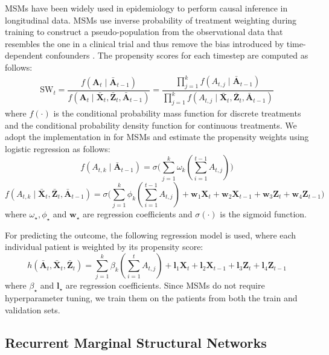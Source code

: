 \documentclass{article}
\newcommand{\vc}[1]{\mathbf{#1}}
\newcommand{\hist}[1]{\bar{\vc{#1}}}
\begin{document}
	MSMs \citep{robins2000marginal, hernan2001marginal} have been widely used in epidemiology to perform causal inference in longitudinal data. MSMs use inverse probability of treatment weighting during training to construct a pseudo-population from the observational data that resembles the one in a clinical trial and thus remove the bias introduced by time-dependent confounders \citep{platt2009time}. The propensity scores for each timestep are computed as follows: 
	\begin{eqnarray}
	\text{SW}_t = \dfrac{f(\vc{A}_t \mid \hist{A}_{t-1})}{ f(\vc{A}_t \mid \hist{X}_{t}, \hist{Z}_t, \hist{A}_{t-1})} =  \dfrac{\prod_{j=1}^{k} f(A_{t,j} \mid \hist{A}_{t-1})}{\prod_{j=1}^{k} f(A_{t,j} \mid \hist{X}_{t}, \hist{Z}_t, \hist{A}_{t-1})}
	\end{eqnarray}
	where $f(\cdot)$ is the conditional probability mass function for discrete treatments and the conditional probability density function for continuous treatments. We adopt the implementation in \citet{hernan2001marginal, howe2012estimating} for MSMs and estimate the propensity weights using logistic regression as follows: 
	\begin{equation}
	f(A_{t,k} \mid \hist{A}_{t-1}) = \sigma \Big(\sum_{j=1}^k \omega_{k}  (\sum_{i=1}^{t-1} A_{t,j}) \Big)
	\end{equation}
	\begin{equation}
	f(A_{t,k} \mid  \hist{X}_{t}, \hist{Z}_t, \hist{A}_{t-1}) = \sigma \Big(\sum_{j=1}^k \phi_{k}  (\sum_{i=1}^{t-1} A_{t,j})   
	+ \vc{w}_1 \vc{X}_t + \vc{w}_2 \vc{X}_{t-1} + \vc{w}_3 \vc{Z}_t + \vc{w}_4 \vc{Z}_{t-1}   \Big)
	\end{equation}
	where $\omega_{\star}, \phi_{\star}$ and $\vc{w}_{\star}$ are regression coefficients and $\sigma(\cdot)$ is the sigmoid function. 
	
	For predicting the outcome, the following regression model is used, where each individual patient is weighted by its propensity score:
	\begin{equation}
	h(\hist{A}_t, \hist{X}_t, \hist{Z}_t) = \sum_{j=1}^k \beta_{k}  (\sum_{i=1}^{t} A_{t,j}) + \vc{l}_1 \vc{X}_t  
	+ \vc{l}_2 \vc{X}_{t-1} + \vc{l}_3 \vc{Z}_t + \vc{l}_4 \vc{Z}_{t-1}   
	\end{equation}
	where $\beta_{\star}$ and $\vc{l}_{\star}$ are regression coefficients. Since MSMs do not require hyperparameter tuning, we train them on the patients from both the train and validation sets. 
	
	
	\subsection {Recurrent Marginal Structural Networks} \label{apx:recurrent_marginal_structural_networks}
	
\end{document}
